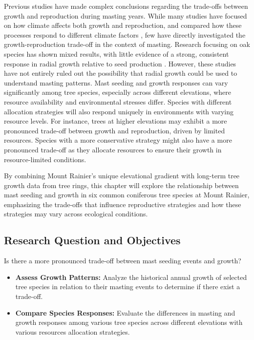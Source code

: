 \documentclass[11pt,letter]{article}
\begin{document}
Previous studies have made complex conclusions regarding the trade-offs between growth and reproduction during masting years. While many studies have focused on how climate affects both growth and reproduction, and compared how these processes respond to different climate factors \citep{koenig2020can, bajocco2021characterizing, redmond2019resource, sanchez2011trade}, few have directly investigated the growth-reproduction trade-off in the context of masting. Research focusing on oak species has shown mixed results, with little evidence of a strong, consistent response in radial growth relative to seed production \citep{koenig2020can, patterson2023acorn}. However, these studies have not entirely ruled out the possibility that radial growth could be used to understand masting patterns. Mast seeding and growth responses can vary significantly among tree species, especially across different elevations, where resource availability and environmental stresses differ. Species with different allocation strategies will also respond uniquely in environments with varying resource levels. For instance, trees at higher elevations may exhibit a more pronounced trade-off between growth and reproduction, driven by limited resources. Species with a more conservative strategy might also have a more pronounced trade-off as they allocate resources to ensure their growth in resource-limited conditions.\par
By combining Mount Rainier's unique elevational gradient with long-term tree growth data from tree rings, this chapter will explore the relationship between mast seeding and growth in six common coniferous tree species at Mount Rainier, emphasizing the trade-offs that influence reproductive strategies and how these strategies may vary across ecological conditions.\par

\subsection{Research Question and Objectives}
Is there a more pronounced trade-off between mast seeding events and growth?
	\begin{itemize}
	\item \textbf{Assess Growth Patterns:} Analyze the historical annual growth of selected tree species in relation to their masting events to determine if there exist a trade-off.
	\item \textbf{Compare Species Responses:} Evaluate the differences in masting and growth responses among various tree species across different elevations with various resources allocation strategies.
	\end{itemize}
\end{document}

